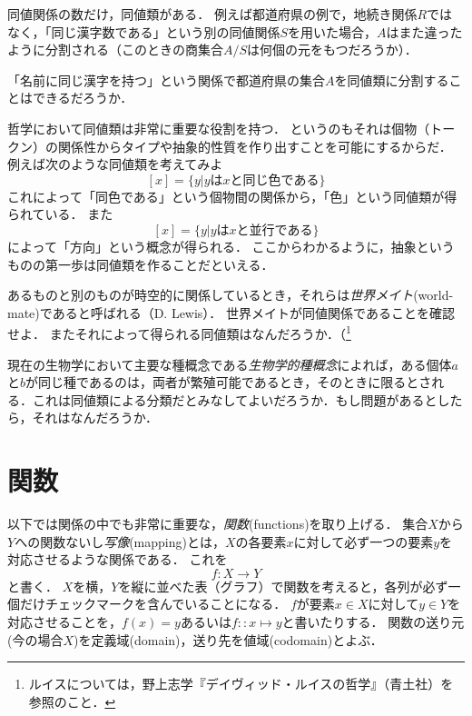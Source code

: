 \documentclass[dvipdfmx, 11pt,a4paper]{jsarticle}
\begin{document}
同値関係の数だけ，同値類がある．
例えば都道府県の例で，地続き関係$R$ではなく，「同じ漢字数である」という別の同値関係$S$を用いた場合，$A$はまた違ったように分割される（このときの商集合$A/S$は何個の元をもつだろうか）．

\begin{renshu}{}{}
「名前に同じ漢字を持つ」という関係で都道府県の集合$A$を同値類に分割することはできるだろうか．
\end{renshu}

哲学において同値類は非常に重要な役割を持つ．
というのもそれは個物（トークン）の関係性からタイプや抽象的性質を作り出すことを可能にするからだ．
例えば次のような同値類を考えてみよ
\[
 [x] = \{ y | y \text{は} x \text{と同じ色である}\}
\]
これによって「同色である」という個物間の関係から，「色」という同値類が得られている．
また
\[
 [x] = \{ y | y \text{は} x \text{と並行である}\}
\]
によって「方向」という概念が得られる．
ここからわかるように，抽象というものの第一歩は同値類を作ることだといえる．


\begin{rei}{}{}
 あるものと別のものが時空的に関係しているとき，それらは\emph{世界メイト}(world-mate)であると呼ばれる（D. Lewis）．
 世界メイトが同値関係であることを確認せよ．
 またそれによって得られる同値類はなんだろうか．（\footnote{ルイスについては，野上志学『デイヴィッド・ルイスの哲学』（青土社）を参照のこと．}
\end{rei}


\begin{rei}{}{}
 現在の生物学において主要な種概念である\emph{生物学的種概念}によれば，ある個体$a$と$b$が同じ種であるのは，両者が繁殖可能であるとき，そのときに限るとされる．これは同値類による分類だとみなしてよいだろうか．もし問題があるとしたら，それはなんだろうか．
\end{rei}



\section{関数}
以下では関係の中でも非常に重要な，\emph{関数}(functions)を取り上げる．
集合$X$から$Y$への関数ないし\emph{写像}(mapping)とは，$X$の各要素$x$に対して必ず一つの要素$y$を対応させるような関係である．
これを
\[
 f : X \to Y
\]
と書く．
$X$を横，$Y$を縦に並べた表（グラフ）で関数を考えると，各列が必ず一個だけチェックマークを含んでいることになる．
$f$が要素$x \in X$に対して$y \in Y$を対応させることを，$f(x)=y$あるいは$f::x \mapsto y$と書いたりする．
関数の送り元(今の場合$X$)を定義域(domain)，送り先を値域(codomain)とよぶ．
\end{document}
